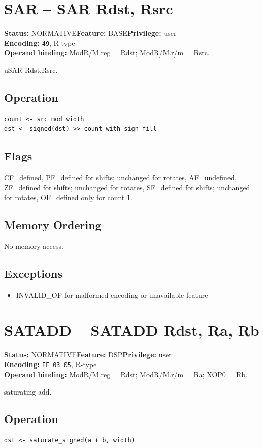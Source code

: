 \documentclass[10pt]{article}
\begin{document}
\section{SAR -- SAR Rdst, Rsrc}
\textbf{Status:} NORMATIVE\quad \textbf{Feature:} BASE\quad \textbf{Privilege:} user\\
\textbf{Encoding:} \texttt{49}, R-type\\
\textbf{Operand binding:} ModR/M.reg = Rdst; ModR/M.r/m = Rsrc.

uSAR Rdst,Rsrc.

\subsection*{Operation}
\begin{lstlisting}
count <- src mod width
dst <- signed(dst) >> count with sign fill
\end{lstlisting}
\subsection*{Flags}
CF=defined, PF=defined for shifts; unchanged for rotates, AF=undefined, ZF=defined for shifts; unchanged for rotates, SF=defined for shifts; unchanged for rotates, OF=defined only for count 1.
\subsection*{Memory Ordering}
No memory access.
\subsection*{Exceptions}
\begin{itemize}
\item INVALID\_OP for malformed encoding or unavailable feature
\end{itemize}
\clearpage

\section{SATADD -- SATADD Rdst, Ra, Rb}
\textbf{Status:} NORMATIVE\quad \textbf{Feature:} DSP\quad \textbf{Privilege:} user\\
\textbf{Encoding:} \texttt{FF 03 05}, R-type\\
\textbf{Operand binding:} ModR/M.reg = Rdst; ModR/M.r/m = Ra; XOP0 = Rb.

saturating add.

\subsection*{Operation}
\begin{lstlisting}
dst <- saturate_signed(a + b, width)
\end{lstlisting}
\end{document}
